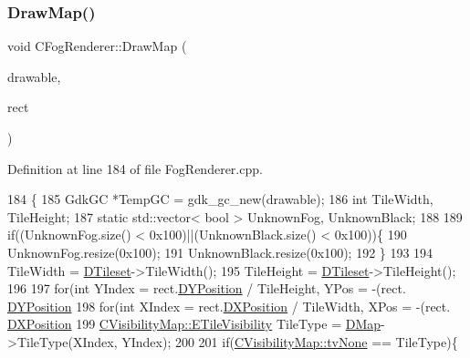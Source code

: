 \subsubsection{\texorpdfstring{Draw\+Map()}{DrawMap()}}
{\footnotesize\ttfamily void C\+Fog\+Renderer\+::\+Draw\+Map (\begin{DoxyParamCaption}\item[{Gdk\+Drawable $\ast$}]{drawable,  }\item[{const \hyperlink{structSRectangle}{S\+Rectangle} \&}]{rect }\end{DoxyParamCaption})}



Definition at line 184 of file Fog\+Renderer.\+cpp.


\begin{DoxyCode}
184                                                                        \{
185     GdkGC *TempGC = gdk\_gc\_new(drawable);
186     \textcolor{keywordtype}{int} TileWidth, TileHeight;
187     \textcolor{keyword}{static} std::vector< bool > UnknownFog, UnknownBlack;
188     
189     \textcolor{keywordflow}{if}((UnknownFog.size() < 0x100)||(UnknownBlack.size() < 0x100))\{
190         UnknownFog.resize(0x100);
191         UnknownBlack.resize(0x100);
192     \}
193     
194     TileWidth = \hyperlink{classCFogRenderer_af9f3956c6e371f112ee1ce5decd7ae89}{DTileset}->TileWidth();
195     TileHeight = \hyperlink{classCFogRenderer_af9f3956c6e371f112ee1ce5decd7ae89}{DTileset}->TileHeight();
196 
197     \textcolor{keywordflow}{for}(\textcolor{keywordtype}{int} YIndex = rect.\hyperlink{structSRectangle_a120aa0a90033bc6e07c36c151a3bbc71}{DYPosition} / TileHeight, YPos = -(rect.
      \hyperlink{structSRectangle_a120aa0a90033bc6e07c36c151a3bbc71}{DYPosition} %
198         \textcolor{keywordflow}{for}(\textcolor{keywordtype}{int} XIndex = rect.\hyperlink{structSRectangle_abcbddb03b3ee416cc33109833b5f075c}{DXPosition} / TileWidth, XPos = -(rect.
      \hyperlink{structSRectangle_abcbddb03b3ee416cc33109833b5f075c}{DXPosition} %
199             \hyperlink{classCVisibilityMap_a6665f905da08825adbb0eee7bd1f2f30}{CVisibilityMap::ETileVisibility} TileType = 
      \hyperlink{classCFogRenderer_a06be3616da23b5fce8ab3407b81788a4}{DMap}->TileType(XIndex, YIndex);
200             
201             \textcolor{keywordflow}{if}(\hyperlink{classCVisibilityMap_a6665f905da08825adbb0eee7bd1f2f30aec106086bdc6328c8c6c02ee1bf32d2c}{CVisibilityMap::tvNone} == TileType)\{

\end{DoxyCode}
